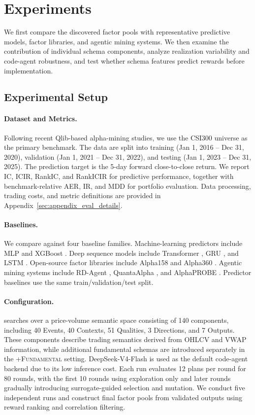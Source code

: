 \section{Experiments}
\label{sec:experiment}

We first compare the discovered factor pools with representative
predictive models, factor libraries, and agentic mining systems. We
then examine the contribution of individual schema components, analyze
realization variability and code-agent robustness, and test whether
schema features predict rewards before implementation.
\subsection{Experimental Setup}

\paragraph{Dataset and Metrics.}
Following recent Qlib-based alpha-mining studies, we use the CSI300
universe as the primary benchmark. The data are split into training
(Jan 1, 2016 -- Dec 31, 2020), validation (Jan 1, 2021 -- Dec 31, 2022),
and testing (Jan 1, 2023 -- Dec 31, 2025). The prediction target is the
5-day forward close-to-close return. We report IC, ICIR, RankIC, and
RankICIR for predictive performance, together with benchmark-relative
AER, IR, and MDD for portfolio evaluation. Data processing, trading
costs, and metric definitions are provided in
Appendix~\ref{sec:appendix_eval_details}.

\paragraph{Baselines.}
We compare against four baseline families. Machine-learning predictors
include MLP and XGBoost \cite{chen2016xgboost}. Deep sequence models
include Transformer \cite{vaswani2017attention}, GRU
\cite{cho2014learning}, and LSTM \cite{hochreiter1997long}.
Open-source factor libraries include Alpha158 and Alpha360
\cite{yang2020qlib}. Agentic mining systems include RD-Agent
\cite{li2025rdagentquant}, QuantaAlpha \cite{han2026quantaalpha}, and
AlphaPROBE \cite{guo2026alphaprobe}. Predictor baselines use the same
train/validation/test split.

\paragraph{Configuration.}
\method{} searches over a price-volume semantic space consisting of 140
components, including 40 Events, 40 Contexts, 51 Qualities, 3 Directions,
and 7 Outputs. These components describe trading semantics derived from
OHLCV and VWAP information, while additional fundamental schemas are
introduced separately in the \textsc{+Fundamental} setting. DeepSeek-V4-Flash
is used as the default code-agent backend due to its low inference cost.
Each run evaluates 12 plans per round for 80 rounds, with the first 10
rounds using exploration only and later rounds gradually introducing
surrogate-guided selection and mutation. We conduct five independent runs
and construct final factor pools from validated outputs using reward
ranking and correlation filtering.

